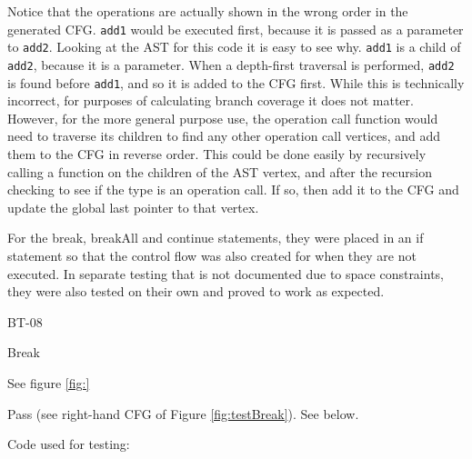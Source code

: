 Notice that the operations are actually shown in the wrong order in the generated CFG. \verb|add1| would be executed first, because it is passed as a parameter to \verb|add2|. Looking at the AST for this code it is easy to see why. \verb|add1| is a child of \verb|add2|, because it is a parameter. When a depth-first traversal is performed, \verb|add2| is found before \verb|add1|, and so it is added to the CFG first. While this is technically incorrect, for purposes of calculating branch coverage it does not matter. However, for the more general purpose use, the operation call function would need to traverse its children to find any other operation call vertices, and add them to the CFG in reverse order. This could be done easily by recursively calling a function on the children of the AST vertex, and after the recursion checking to see if the type is an operation call. If so, then add it to the CFG and update the global last pointer to that vertex.

\begin{figure}
\centering
\begin{minipage}{.25\textwidth}
  \centering
  \caption{}
  \label{fig:testBreak}
\end{minipage}%
\begin{minipage}{.25\textwidth}
  \centering
  \caption{}
  \label{fig:testBreakAll}
\end{minipage}%
\begin{minipage}{.25\textwidth}
  \centering
    \caption{}
  	\label{fig:testContinue}
\end{minipage}
\end{figure}
For the break, breakAll and continue statements, they were placed in an if statement so that the control flow was also created for when they are not executed. In separate testing that is not documented due to space constraints, they were also tested on their own and proved to work as expected.

\begin{minipage}{.6\textwidth}
\begin{description}[style=sameline,leftmargin=4.5cm,nolistsep]
\item[\hspace*{0.3cm}Label] BT-08
\item[\hspace*{0.3cm}Statement under Test] Break
\item[\hspace*{0.3cm}Expected Output] See figure \ref{fig:}
\item[\hspace*{0.3cm}Result] Pass (see right-hand CFG of Figure \ref{fig:testBreak}). See below.
\end{description}
\end{minipage}
\begin{minipage}{.39\textwidth}
  \centering
  Code used for testing:
  
\end{minipage}

